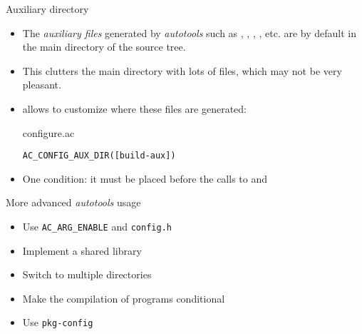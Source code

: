 \begin{frame}[fragile]{Auxiliary directory}

  \begin{itemize}

  \item The {\em auxiliary files} generated by {\em autotools} such as
    , , ,
    , etc. are by default in the main directory of the
    source tree.

  \item This clutters the main directory with lots of files, which may
    not be very pleasant.

  \item {} allows to customize where these files
    are generated:
    \begin{block}{configure.ac}
      \begin{verbatim}
AC_CONFIG_AUX_DIR([build-aux])
\end{verbatim}
\end{block}

\item One condition: it must be placed before the calls to
   and 

  \end{itemize}

\end{frame}

\setuplabframe
{More advanced {\em autotools} usage}
{
  \begin{itemize}
  \item Use {\tt AC\_ARG\_ENABLE} and {\tt config.h}
  \item Implement a shared library
  \item Switch to multiple directories
  \item Make the compilation of programs conditional
  \item Use {\tt pkg-config}
  \end{itemize}
}
